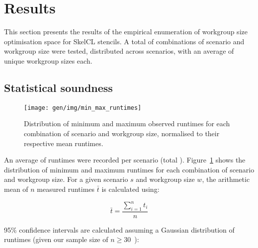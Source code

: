 
\section{Results}

This section presents the results of the empirical enumeration of
workgroup size optimisation space for SkelCL stencils. A total of
 combinations of scenario and workgroup
size were tested, distributed across 
scenarios, with an average of  unique
workgroup sizes each. %

\subsection{Statistical soundness}

\begin{figure}
\centering
\texttt{[image: gen/img/min\_max\_runtimes]}
\caption{%
  Distribution of minimum and maximum observed runtimes for each
  combination of scenario and workgroup size, normalised to their
  respective mean runtimes. %
}
\label{fig:min-max-runtimes}
\end{figure}

An average of  runtimes were recorded per
scenario (total
). Figure~\ref{fig:min-max-runtimes} shows the
distribution of minimum and maximum runtimes for each combination of
scenario and workgroup size. For a given scenario $s$ and workgroup
size $w$, the arithmetic mean of $n$ measured runtimes $\bar{t}$ is
calculated using:

\begin{equation}
\bar{t} = \frac{\sum_{i=1}^{n}t_i}{n}
\end{equation}

95\% confidence intervals are calculated assuming a Gaussian
distribution of runtimes (given our sample size of
$n \ge 30$~\cite{Georges2007}):


